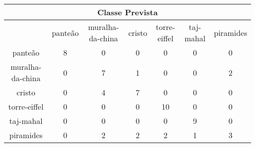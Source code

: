\begin{tabular}{|c|c|c|c|c|c|c|}
\hline
\multicolumn{7}{|c|}{Classe Prevista}\\
\hline
 & panteão & muralha-da-china & cristo & torre-eiffel & taj-mahal & piramides\\
panteão & 8 & 0 & 0 & 0 & 0 & 0\\
muralha-da-china & 0 & 7 & 1 & 0 & 0 & 2\\
cristo & 0 & 4 & 7 & 0 & 0 & 0\\
torre-eiffel & 0 & 0 & 0 & 10 & 0 & 0\\
taj-mahal & 0 & 0 & 0 & 0 & 9 & 0\\
piramides & 0 & 2 & 2 & 2 & 1 & 3\\
\hline
\end{tabular}

